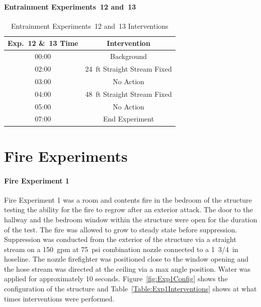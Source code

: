 \documentclass[12pt,oneside]{book}
\begin{document}
\FloatBarrier

\paragraph{Entrainment Experiments~12 and~13} \mbox{}


\begin{table}[H]
	\centering
	\caption{Entrainment Experiments~12 and~13 Interventions}
	\begin{tabular}{|c|c|} 
		\hline
		Exp.~12 \&~13 Time 	& 	Intervention 	\\ \hline \hline
			00:00 	 		&	Background 	\\ \hline
			02:00 			&	24~ft Straight Stream Fixed 	\\ \hline
			03:00 			&	No Action 	\\ \hline
			04:00 			&	48~ft Straight Stream Fixed 	\\ \hline
			05:00 			&	No Action 	\\ \hline
			07:00 			&	End Experiment 	\\ \hline
	\end{tabular}
	\label{Table:EntExp12_and_13_Interventions}
\end{table}

\clearpage
\section*{Fire Experiments}

\paragraph{Fire Experiment 1} \mbox{}

Fire Experiment 1 was a room and contents fire in the bedroom of the structure testing the ability for the fire to regrow after an exterior attack. The door to the hallway and the bedroom window within the structure were open for the duration of the test. The fire was allowed to grow to steady state before suppression. Suppression was conducted from the exterior of the structure via a straight stream on a 150~gpm at 75~psi combination nozzle connected to a 1~3/4~in hoseline. The nozzle firefighter was positioned close to the window opening and the hose stream was directed at the ceiling via a max angle position. Water was applied for approximately 10 seconds. Figure~\ref{fig:Exp1Config} shows the configuration of the structure and Table~\ref{Table:Exp1Interventions} shows at what times interventions were performed. 
\end{document}
